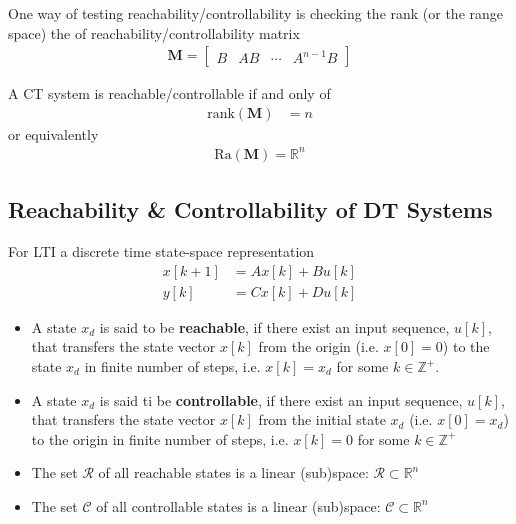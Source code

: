 \documentclass[twoside]{article}
\begin{document}
One way of testing reachability/controllability is checking the rank
(or the range space) the of reachability/controllability matrix
%
\begin{align*}
  \mathbf{M} = \left[ \begin{array}{cccc} B & A B & \cdots & A^{n-1} B \end{array} \right]
\end{align*} 
%

A CT system is reachable/controllable if and only of
%
\begin{align*}
  \mathrm{rank} ( \mathbf{M} ) &= n
\end{align*} 
%
or equivalently 
%
\begin{align*}
 \mathrm{Ra} ( \mathbf{M} ) = \mathbb{R}^n
\end{align*} 


\subsection*{Reachability \& Controllability of DT Systems}

For LTI a discrete time state-space representation
%
\begin{align*}
  x[k+1] &= A x[k] + B u[k]
\\
  y[k] &= C x[k] + D u[k]
\end{align*}
%
\begin{itemize}
  \item A state $x_d$ is said to be \textbf{reachable}, if there exist
  an input sequence, $u[k]$, that transfers the state vector 
  $x[k]$ from the origin (i.e. $x[0] = 0$) to the state $x_d$ in finite
  number of steps, i.e. $x[k] = x_d$ for some $k \in \mathbb{Z}^+$.
 
  \item A state $x_d$ is said ti be \textbf{controllable},
  if there exist an input sequence, $u[k]$, that transfers the state vector 
  $x[k]$ from the initial state $x_d$ (i.e. $x[0] = x_d$) to the origin
  in finite number of steps, i.e. $x[k] = 0$ for some $k \in \mathbb{Z}^+$ 
\end{itemize}

\begin{itemize}
  \item The set $\mathcal{R}$ of all reachable states is a linear
(sub)space: $\mathcal{R} \subset \mathbb{R}^n$
  \item The set $\mathcal{C}$ of all controllable states is a linear
(sub)space: $\mathcal{C} \subset \mathbb{R}^n$
\end{itemize}
\end{document}
